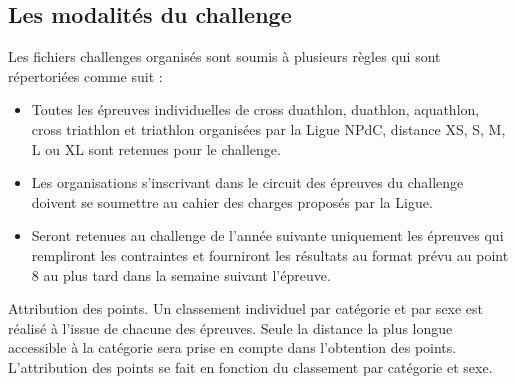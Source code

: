 	
	\subsection{Les modalités du challenge  }
	Les fichiers challenges organisés sont soumis à plusieurs règles qui sont répertoriées comme suit :
	\begin{itemize} 
	\item 	Toutes les épreuves individuelles de cross duathlon, duathlon, aquathlon, cross triathlon et triathlon organisées par la Ligue NPdC, distance XS, S, M, L ou XL sont retenues pour le challenge.
	\item 	Les organisations s'inscrivant dans le circuit des épreuves du challenge doivent se soumettre au cahier des charges proposés par la Ligue.
	 \item  Seront retenues au challenge de l’année suivante uniquement les épreuves qui rempliront les contraintes et fourniront les résultats au format prévu au point 8 au plus tard dans la semaine suivant l’épreuve.
	
	\end{itemize} 
\newpage
	 Attribution des points. Un classement individuel par catégorie et par sexe est réalisé à l’issue de chacune des épreuves. Seule la distance la plus longue accessible à la catégorie sera prise en compte dans l’obtention des points.\\
	L’attribution des points se fait en fonction du classement par catégorie et sexe. 
	
